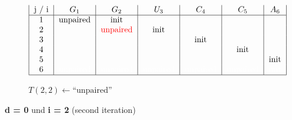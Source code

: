 \begin{figure}[H]
\begin{subfigure}[t]{0.65\textwidth}
\[\begin{tabular}{|c|c|c|c|c|c|c|}
                                    j / i & $G_1$    & $G_2$                     & $U_3$ & $C_4$ & $C_5$ & $A_6$ \\ \hline
                                    1     & unpaired & init                      &       &       &       &       \\
                                    2     &          & \textcolor{red}{unpaired} & init  &       &       &       \\
                                    3     &          &                           &       & init  &       &       \\
                                    4     &          &                           &       &       & init  &       \\
                                    5     &          &                           &       &       &       & init  \\
                                    6 & \textcolor{white}{unpaired} & \textcolor{white}{unpaired} & \textcolor{white}{unpaired}
                                    & \textcolor{white}{unpaired}
                                    & \textcolor{white}{unpaired}
                                    & \textcolor{white}{init}
                                    \\ \hline
                        \end{tabular}
        \]
        \caption{$T(2,2) \gets \text{``unpaired''}$ }
    \end{subfigure}
    \caption{\textbf{d = 0} und \textbf{i = 2} (second iteration)}\label{fig:figure23}

\end{figure}


